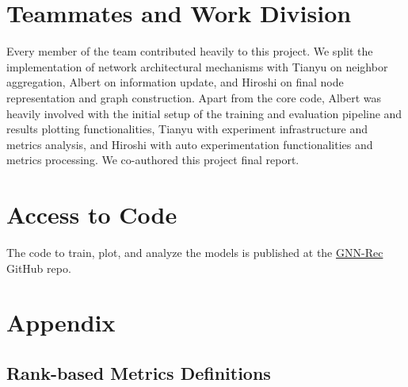 \documentclass{article}
\begin{document}
\section{Teammates and Work Division}


Every member of the team contributed heavily to this project. We split the implementation of network architectural mechanisms with Tianyu on neighbor aggregation, Albert on information update, and Hiroshi on final node representation and graph construction. Apart from the core code, Albert was heavily involved with the initial setup of the training and evaluation pipeline and results plotting functionalities, Tianyu with experiment infrastructure and metrics analysis, and Hiroshi with auto experimentation functionalities and metrics processing. We co-authored this project final report.

\section{Access to Code}


The code to train, plot, and analyze the models is published at the \href{https://github.com/thisisalbertliang/gnn-rec}{GNN-Rec} GitHub repo.

\newpage

\section{Appendix}

\subsection{Rank-based Metrics Definitions} \label{rank-metrics-def}
\end{document}
